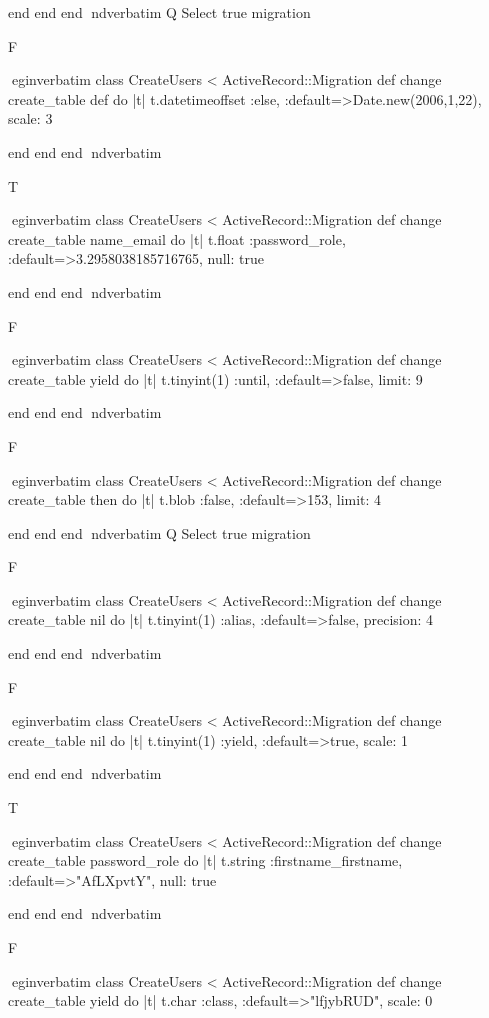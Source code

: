     end 
  end 
end
nd{verbatim}
Q
 Select true migration

F

egin{verbatim}
 class CreateUsers < ActiveRecord::Migration 
  def change 
    create_table def do |t| 
      t.datetimeoffset :else, :default=>Date.new(2006,1,22), scale: 3
    
    end 
  end 
end
nd{verbatim}

T

egin{verbatim}
 class CreateUsers < ActiveRecord::Migration 
  def change 
    create_table name_email do |t| 
      t.float :password_role, :default=>3.2958038185716765, null: true
    
    end 
  end 
end
nd{verbatim}

F

egin{verbatim}
 class CreateUsers < ActiveRecord::Migration 
  def change 
    create_table yield do |t| 
      t.tinyint(1) :until, :default=>false, limit: 9
    
    end 
  end 
end
nd{verbatim}

F

egin{verbatim}
 class CreateUsers < ActiveRecord::Migration 
  def change 
    create_table then do |t| 
      t.blob :false, :default=>153, limit: 4
    
    end 
  end 
end
nd{verbatim}
Q
 Select true migration

F

egin{verbatim}
 class CreateUsers < ActiveRecord::Migration 
  def change 
    create_table nil do |t| 
      t.tinyint(1) :alias, :default=>false, precision: 4
    
    end 
  end 
end
nd{verbatim}

F

egin{verbatim}
 class CreateUsers < ActiveRecord::Migration 
  def change 
    create_table nil do |t| 
      t.tinyint(1) :yield, :default=>true, scale: 1
    
    end 
  end 
end
nd{verbatim}

T

egin{verbatim}
 class CreateUsers < ActiveRecord::Migration 
  def change 
    create_table password_role do |t| 
      t.string :firstname_firstname, :default=>"AfLXpvtY", null: true
    
    end 
  end 
end
nd{verbatim}

F

egin{verbatim}
 class CreateUsers < ActiveRecord::Migration 
  def change 
    create_table yield do |t| 
      t.char :class, :default=>"lfjybRUD", scale: 0
    
